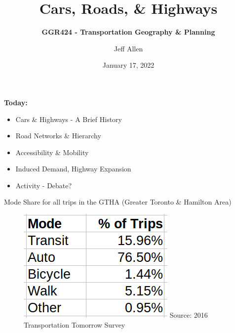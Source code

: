 \documentclass[aspectratio=169]{beamer}
\title{\textbf{Cars, Roads, \& Highways}}
\subtitle{\textbf{GGR424 - Transportation Geography \& Planning}}
\author{Jeff Allen}
\institute{University of Toronto}
\date{January 17, 2022}
\begin{document}
	
\begin{frame}
	\titlepage	
\end{frame}



\begin{frame}
\textbf{Today:}
\begin{itemize}
	\item Cars \& Highways - A Brief History
	\item Road Networks \& Hierarchy
	\item Accessibility \& Mobility
	\item Induced Demand, Highway Expansion
	\item Activity - Debate?
\end{itemize}
\end{frame}



\begin{frame}
	
	Mode Share for all trips in the GTHA (Greater Toronto \& Hamilton Area)
	
	\vspace{4mm}
	
	\begin{figure}
		\centering
		\includegraphics[width=0.3\linewidth]{images/mode_share_gtha_2016.png}
		\tiny{Source: 2016 Transportation Tomorrow Survey}
	\end{figure}
	
\end{frame}
\end{document}
